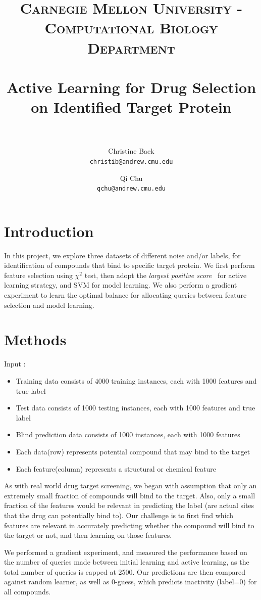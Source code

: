 \documentclass[paper=a4, fontsize=11pt]{scrartcl}
\title{
    \usefont{OT1}{bch}{b}{n}
    \normalfont \normalsize \textsc{Carnegie Mellon University - Computational Biology Department} \\ [25pt]
    \horrule{0.5pt} \\[0.4cm]
    \huge Active Learning for Drug Selection\\ on Identified Target Protein \\
    \horrule{2pt} \\[0.5cm]
}
\author{
  Christine Baek\\
  \normalsize\texttt{christib@andrew.cmu.edu}
  \and
  Qi Chu\\
  \normalsize\texttt{qchu@andrew.cmu.edu}
  \date{}
}
\date{}
\numberwithin{equation}{section}    %
\numberwithin{figure}{section}      %
\numberwithin{table}{section}       %
\numberwithin{equation}{section}    %
\numberwithin{figure}{section}      %
\numberwithin{table}{section}       %
\begin{document}
\maketitle
\section{Introduction}
In this project, we explore three datasets of different noise and/or labels, for identification of compounds that bind to specific target protein. We first perform feature selection using $\chi^2$ test, then adopt the \textit{largest positive score}~\cite{ref:warmuth} for active learning strategy, and SVM for model learning. We also perform a gradient experiment to learn the optimal balance for allocating queries between feature selection and model learning.



\section{Methods}

Input :
\begin{itemize}
\item Training data consists of 4000 training instances, each with 1000 features and true label 
\item Test data consists of 1000 testing instances, each with 1000 features and true label
\item Blind prediction data consists of 1000 instances, each with 1000 features
\item Each data(row) represents potential compound that may bind to the target
\item Each feature(column) represents a structural or chemical feature
\end{itemize}




As with real world drug target screening, we began with assumption that only an extremely small fraction of compounds will bind to the target. Also, only a small fraction of the features would be relevant in predicting the label (are actual sites that the drug can potentially bind to). Our challenge is to first find which features are relevant in accurately predicting whether the compound will bind to the target or not, and then learning on those features.


We performed a gradient experiment, and measured the performance based on the number of queries made between initial learning and active learning, as the total number of queries is capped at 2500. Our predictions are then compared against random learner, as well as 0-guess, which predicts inactivity (label=0) for all compounds. 
\end{document}
